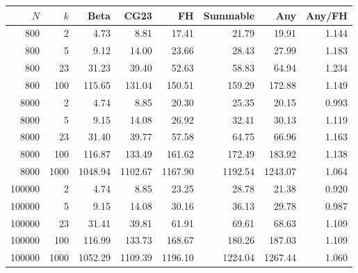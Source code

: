 \begin{tabular}{rrrrrrrr}
\toprule
$N$ & $k$ & Beta & CG23 & FH & Summable & Any & Any/FH\\
\midrule
800 & 2 & 4.73 & 8.81 & 17.41 & 21.79 & 19.91 & 1.144\\
800 & 5 & 9.12 & 14.00 & 23.66 & 28.43 & 27.99 & 1.183\\
800 & 23 & 31.23 & 39.40 & 52.63 & 58.83 & 64.94 & 1.234\\
800 & 100 & 115.65 & 131.04 & 150.51 & 159.29 & 172.88 & 1.149\\
8000 & 2 & 4.74 & 8.85 & 20.30 & 25.35 & 20.15 & 0.993\\
8000 & 5 & 9.15 & 14.08 & 26.92 & 32.41 & 30.13 & 1.119\\
8000 & 23 & 31.40 & 39.77 & 57.58 & 64.75 & 66.96 & 1.163\\
8000 & 100 & 116.87 & 133.49 & 161.62 & 172.49 & 183.92 & 1.138\\
8000 & 1000 & 1048.94 & 1102.67 & 1167.90 & 1192.54 & 1243.07 & 1.064\\
100000 & 2 & 4.74 & 8.85 & 23.25 & 28.78 & 21.38 & 0.920\\
100000 & 5 & 9.15 & 14.08 & 30.16 & 36.13 & 29.78 & 0.987\\
100000 & 23 & 31.41 & 39.81 & 61.91 & 69.61 & 68.63 & 1.109\\
100000 & 100 & 116.99 & 133.73 & 168.67 & 180.26 & 187.03 & 1.109\\
100000 & 1000 & 1052.29 & 1109.39 & 1196.10 & 1224.04 & 1267.44 & 1.060\\
\bottomrule
\end{tabular}

